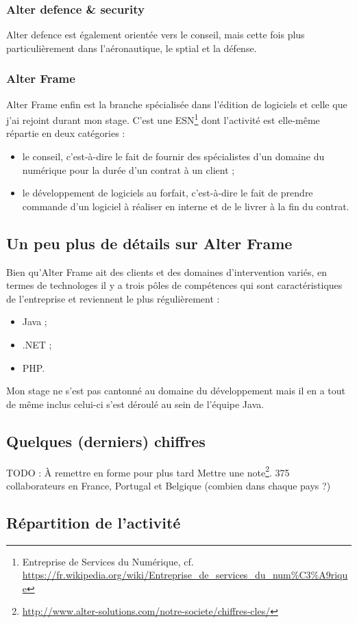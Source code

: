 \subsubsection{Alter defence \& security}
Alter defence est également orientée vers le conseil, mais cette fois plus particulièrement dans l'aéronautique, le sptial et la défense.
  
\subsubsection{Alter Frame}
Alter Frame enfin est la branche spécialisée dans l'édition de logiciels et celle que j'ai rejoint durant mon stage. C'est une ESN\footnote{Entreprise de Services du Numérique, cf. \url{https://fr.wikipedia.org/wiki/Entreprise_de_services_du_num\%C3\%A9rique}} dont l'activité est elle-même répartie en deux catégories :
\begin{itemize}[label=$\bullet$]
\item le conseil, c'est-à-dire le fait de fournir des spécialistes d'un domaine du numérique pour la durée d'un contrat à un client ;
\item le développement de logiciels au forfait, c'est-à-dire le fait de prendre commande d'un logiciel à réaliser en interne et de le livrer à la fin du contrat.
\end{itemize}

\subsection{Un peu plus de détails sur Alter Frame}
\label{subsec:frame}
Bien qu'Alter Frame ait des clients et des domaines d'intervention variés, en termes de technologes il y a trois pôles de compétences qui sont caractéristiques de l'entreprise et reviennent le plus régulièrement :
\begin{itemize}[label=$\bullet$]
\item Java ;
\item .NET ;
\item PHP.
\end{itemize}

Mon stage ne s'est pas cantonné au domaine du développement mais il en a tout de même inclus celui-ci s'est déroulé au sein de l'équipe Java.
    
\subsection{Quelques (derniers) chiffres}
TODO : À remettre en forme pour plus tard
Mettre une note\footnote{\url{http://www.alter-solutions.com/notre-societe/chiffres-cles/}}.
375 collaborateurs en France, Portugal et Belgique (combien dans chaque pays ?)

\subsection{Répartition de l'activité}
